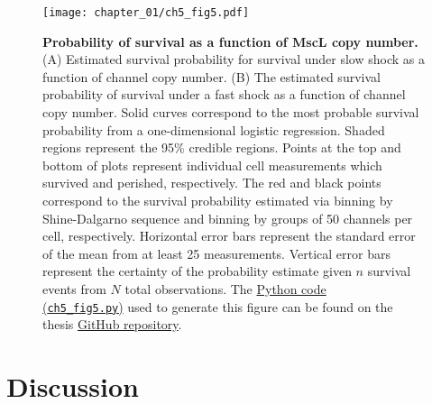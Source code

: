 \documentclass[12pt]{caltech_thesis}
\begin{document}
\hypertarget{fig:survival}{%
\begin{figure}
\centering
\texttt{[image: chapter\_01/ch5\_fig5.pdf]}
\caption[{Probability of survival as a function of MscL copy
number.}]{\textbf{Probability of survival as a function of MscL copy
number.} (A) Estimated survival probability for survival under slow
shock as a function of channel copy number. (B) The estimated survival
probability of survival under a fast shock as a function of channel copy
number. Solid curves correspond to the most probable survival
probability from a one-dimensional logistic regression. Shaded regions
represent the 95\% credible regions. Points at the top and bottom of
plots represent individual cell measurements which survived and
perished, respectively. The red and black points correspond to the
survival probability estimated via binning by Shine-Dalgarno sequence
and binning by groups of 50 channels per cell, respectively. Horizontal
error bars represent the standard error of the mean from at least 25
measurements. Vertical error bars represent the certainty of the
probability estimate given \(n\) survival events from \(N\) total
observations. The
\href{https://github.com/gchure/phd/blob/master/src/chapter_05/code/ch5_fig5.py}{Python
code\\
(\texttt{ch5\_fig5.py})} used to generate this figure can be found on
the thesis \href{https://github.com/gchure/phd}{GitHub repository}.}
\label{fig:survival}
\end{figure}
}

\hypertarget{discussion-3}{%
\section{Discussion}\label{discussion-3}}
\end{document}
